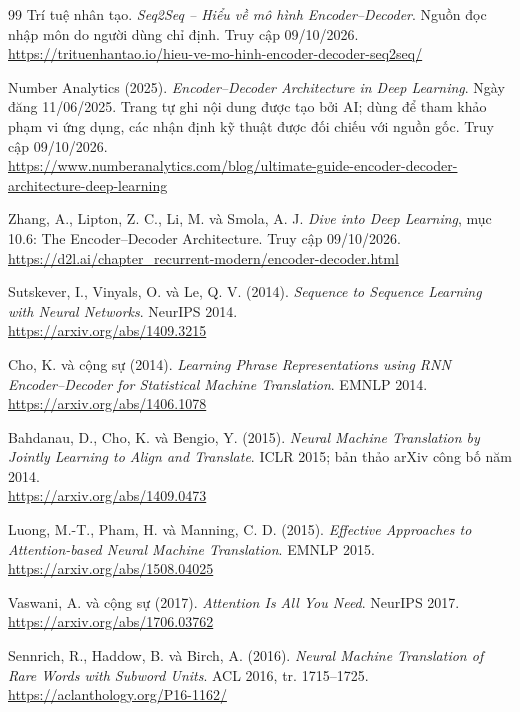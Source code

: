 \documentclass[11pt,a4paper]{article}
\numberwithin{equation}{section}
\begin{document}
\clearpage
{}
{}
\begin{thebibliography}{99}
\small
{} Trí tuệ nhân tạo. \emph{Seq2Seq -- Hiểu về mô hình Encoder--Decoder}. Nguồn đọc nhập môn do người dùng chỉ định. Truy cập 09/10/2026.\\
\url{https://trituenhantao.io/hieu-ve-mo-hinh-encoder-decoder-seq2seq/}

 Number Analytics (2025). \emph{Encoder--Decoder Architecture in Deep Learning}. Ngày đăng 11/06/2025. Trang tự ghi nội dung được tạo bởi AI; dùng để tham khảo phạm vi ứng dụng, các nhận định kỹ thuật được đối chiếu với nguồn gốc. Truy cập 09/10/2026.\\
\url{https://www.numberanalytics.com/blog/ultimate-guide-encoder-decoder-architecture-deep-learning}

 Zhang, A., Lipton, Z. C., Li, M. và Smola, A. J. \emph{Dive into Deep Learning}, mục 10.6: The Encoder--Decoder Architecture. Truy cập 09/10/2026.\\
\url{https://d2l.ai/chapter_recurrent-modern/encoder-decoder.html}

 Sutskever, I., Vinyals, O. và Le, Q. V. (2014). \emph{Sequence to Sequence Learning with Neural Networks}. NeurIPS 2014.\\
\url{https://arxiv.org/abs/1409.3215}

 Cho, K. và cộng sự (2014). \emph{Learning Phrase Representations using RNN Encoder--Decoder for Statistical Machine Translation}. EMNLP 2014.\\
\url{https://arxiv.org/abs/1406.1078}

 Bahdanau, D., Cho, K. và Bengio, Y. (2015). \emph{Neural Machine Translation by Jointly Learning to Align and Translate}. ICLR 2015; bản thảo arXiv công bố năm 2014.\\
\url{https://arxiv.org/abs/1409.0473}

 Luong, M.-T., Pham, H. và Manning, C. D. (2015). \emph{Effective Approaches to Attention-based Neural Machine Translation}. EMNLP 2015.\\
\url{https://arxiv.org/abs/1508.04025}

 Vaswani, A. và cộng sự (2017). \emph{Attention Is All You Need}. NeurIPS 2017.\\
\url{https://arxiv.org/abs/1706.03762}

 Sennrich, R., Haddow, B. và Birch, A. (2016). \emph{Neural Machine Translation of Rare Words with Subword Units}. ACL 2016, tr. 1715--1725.\\
\url{https://aclanthology.org/P16-1162/}


\end{thebibliography}
\end{document}
